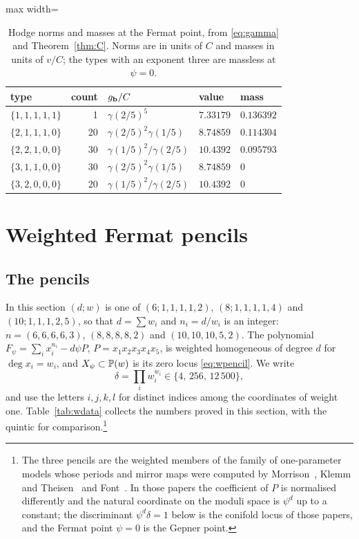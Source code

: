 \begin{table}[t]
\caption{Hodge norms and masses at the Fermat point, from
\eqref{eq:gamma} and Theorem~\ref{thm:C}. Norms are in units of $C$ and
masses in units of $v/C$; the types with an exponent three are massless at
$\psi=0$.}
\label{tab:fermat}
\centering
\begin{adjustbox}{max width=\linewidth}\begin{tabular}{lrlll}
\toprule
type & count & $g_{\mathbf{b}}/C$ & value & mass\\
\midrule
$\{1,1,1,1,1\}$ & 1 & $\gamma(2/5)^5$ & $7.33179$ & $0.136392$\\
$\{2,1,1,1,0\}$ & 20 & $\gamma(2/5)^2\gamma(1/5)$ & $8.74859$ & $0.114304$\\
$\{2,2,1,0,0\}$ & 30 & $\gamma(1/5)^2/\gamma(2/5)$ & $10.4392$ & $0.095793$\\
$\{3,1,1,0,0\}$ & 30 & $\gamma(2/5)^2\gamma(1/5)$ & $8.74859$ & $0$\\
$\{3,2,0,0,0\}$ & 20 & $\gamma(1/5)^2/\gamma(2/5)$ & $10.4392$ & $0$\\
\bottomrule
\end{tabular}\end{adjustbox}
\end{table}

\section{Weighted Fermat pencils}\label{sec:weighted}

\subsection{The pencils}

In this section $(d;w)$ is one of $(6;1,1,1,1,2)$, $(8;1,1,1,1,4)$ and
$(10;1,1,1,2,5)$, so that $d=\sum w_i$ and $n_i=d/w_i$ is an integer:
$n=(6,6,6,6,3)$, $(8,8,8,8,2)$ and $(10,10,10,5,2)$. The polynomial
$F_\psi=\sum_ix_i^{n_i}-d\psi P$, $P=x_1x_2x_3x_4x_5$, is weighted
homogeneous of degree $d$ for $\deg x_i=w_i$, and $X_\psi\subset\mathbb{P}(w)$ is
its zero locus \eqref{eq:wpencil}. We write
\[
\delta=\prod_iw_i^{w_i}\in\{4,\,256,\,12\,500\},
\]
and use the letters $i,j,k,l$ for distinct indices among the coordinates of
weight one. Table~\ref{tab:wdata} collects the numbers proved in this
section, with the quintic for comparison.\footnote{The three pencils are the
weighted members of the family of one-parameter models whose periods and
mirror maps were computed by Morrison~\cite{Mor92}, Klemm and
Theisen~\cite{KT93} and Font~\cite{Fon93}. In those papers the coefficient
of $P$ is normalised differently and the natural coordinate on the moduli
space is $\psi^d$ up to a constant; the discriminant $\psi^d\delta=1$ below
is the conifold locus of those papers, and the Fermat point $\psi=0$ is the
Gepner point.}

